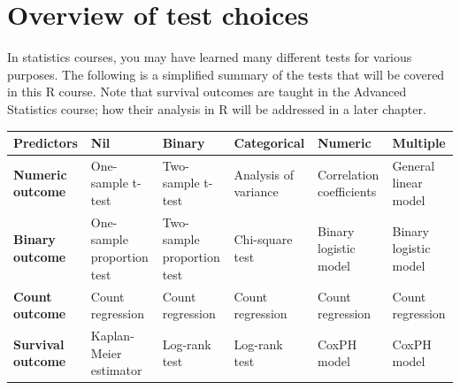 \documentclass[
]{book}
\newcounter{none} %
\begin{document}
\section{Overview of test choices}\label{overview-of-test-choices}

In statistics courses, you may have learned many different tests for various purposes. The following is a simplified summary of the tests that will be covered in this R course. Note that survival outcomes are taught in the Advanced Statistics course; how their analysis in R will be addressed in a later chapter.

{\def\LTcaptype{none} %
\begin{longtable}[]{@{}
  >{\raggedright\arraybackslash}p{}
  >{\centering\arraybackslash}p{}
  >{\centering\arraybackslash}p{}
  >{\centering\arraybackslash}p{}
  >{\centering\arraybackslash}p{}
  >{\centering\arraybackslash}p{}@{}}
\toprule\noalign{}
\begin{minipage}[b]{\linewidth}\raggedright
Predictors
\end{minipage} & \begin{minipage}[b]{\linewidth}\centering
Nil
\end{minipage} & \begin{minipage}[b]{\linewidth}\centering
Binary
\end{minipage} & \begin{minipage}[b]{\linewidth}\centering
Categorical
\end{minipage} & \begin{minipage}[b]{\linewidth}\centering
Numeric
\end{minipage} & \begin{minipage}[b]{\linewidth}\centering
Multiple
\end{minipage} \\
\midrule\noalign{}
\endhead
\bottomrule\noalign{}
\endlastfoot
\textbf{Numeric outcome} & One-sample t-test & Two-sample t-test & Analysis of variance & Correlation coefficients & General linear model \\
\textbf{Binary outcome} & One-sample proportion test & Two-sample proportion test & Chi-square test & Binary logistic model & Binary logistic model \\
\textbf{Count outcome} & Count regression & Count regression & Count regression & Count regression & Count regression \\
\textbf{Survival outcome} & Kaplan-Meier estimator & Log-rank test & Log-rank test & CoxPH model & CoxPH model \\
\end{longtable}
}
\end{document}
